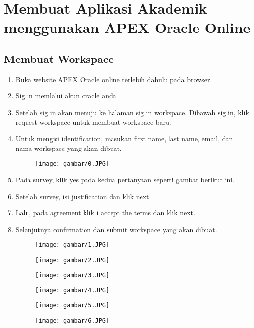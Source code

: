 \chapter{Membuat Aplikasi Akademik menggunakan APEX Oracle Online}

\section{Membuat Workspace}

\begin{enumerate}
    \item Buka website APEX Oracle online terlebih dahulu pada browser.
    \item Sig in memlalui akun oracle anda
    \item Setelah sig in akan menuju ke halaman sig in workspace. Dibawah sig in, klik request workspace untuk membuat workspace baru.

    \item Untuk mengisi identification, masukan first name, last name, email, dan nama workspace yang akan dibuat.
    
\begin{figure}[!htbp]
    \centering
    \texttt{[image: gambar/0.JPG]}
    \label{penanda}
\end{figure}

    \item Pada survey, klik yes pada kedua pertanyaan seperti gambar berikut ini.
    \item Setelah survey, isi justification dan klik next
    \item Lalu, pada agreement klik i accept the terms dan klik next.
    \item Selanjutnya confirmation dan submit workspace yang akan dibuat.
    
\begin{figure}[!htbp]
    \centering
    \texttt{[image: gambar/1.JPG]}
    \label{penanda}
\end{figure}
    
\begin{figure}[!htbp]
    \centering
    \texttt{[image: gambar/2.JPG]}
    \label{penanda}
\end{figure}

\begin{figure}[!htbp]
    \centering
    \texttt{[image: gambar/3.JPG]}
    \label{penanda}
\end{figure}

\begin{figure}[!htbp]
    \centering
    \texttt{[image: gambar/4.JPG]}
    \label{penanda}
\end{figure}

\begin{figure}[!htbp]
    \centering
    \texttt{[image: gambar/5.JPG]}
    \label{penanda}
\end{figure}
\begin{figure}[!htbp]
    \centering
    \texttt{[image: gambar/6.JPG]}
    \label{penanda}
\end{figure}

\end{enumerate}

